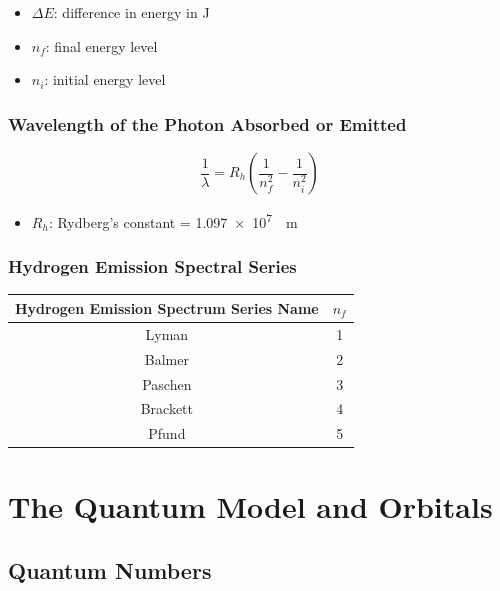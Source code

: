 \documentclass{article}
\begin{document}
\begin{itemize}
    \item $\Delta E$: difference in energy in \si{\joule}
    \item $n_f$: final energy level
    \item $n_i$: initial energy level
\end{itemize}

\subsubsection{Wavelength of the Photon Absorbed or Emitted}

\begin{equation*}
    \frac{1}{\lambda} = R_h \left(\frac{1}{n_f^2} - \frac{1}{n_i^2}\right)
\end{equation*}

\begin{itemize}
    \item $R_h$: Rydberg's constant = \SI{1.097e7}{\per\meter}
\end{itemize}

\subsubsection{Hydrogen Emission Spectral Series}

\begin{center}
    \begin{tabular}{|c|c|}
        \hline
        \textbf{Hydrogen Emission Spectrum Series Name} & $n_f$ \\ 
        \hline
        Lyman & 1 \\
        Balmer & 2 \\
        Paschen & 3 \\
        Brackett & 4 \\
        Pfund & 5 \\
        \hline 
    \end{tabular}
\end{center}

\section{The Quantum Model and Orbitals}

\subsection{Quantum Numbers}
\end{document}
